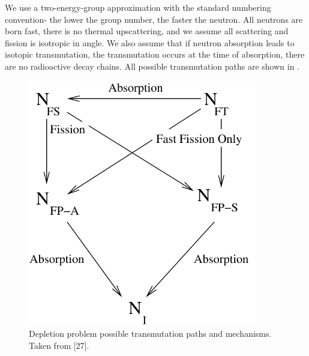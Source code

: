 We use a two-energy-group approximation with the standard numbering convention- the lower the group number, the faster the neutron.  
All neutrons are born fast, there is no thermal upscattering, and we assume all scattering and fission is isotropic in angle.
We also assume that if neutron absorption leads to isotopic transmutation, the transmutation occurs at the time of absorption, there are no radioactive decay chains.
All possible transmutation paths are shown in .
\begin{figure}[!htp]
\begin{center}
\includegraphics[width=10cm]{chapter5_depletion/article_transmutation.pdf}
\end{center}
\caption{Depletion problem possible transmutation paths and mechanisms.  Taken from [27].}
\label{fig:transmutation}
\end{figure}

